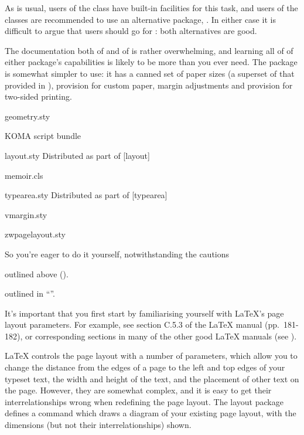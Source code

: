 As is usual, users of the  class have built-in
facilities for this task, and users of the  classes
are recommended to use an alternative package, .  In
either case it is difficult to argue that users should go for
: both alternatives are good.

The documentation both of  and of
 is rather overwhelming, and
learning all of of either package's capabilities is likely to be more
than you ever need.
The  package is somewhat simpler to use: it has a
canned set of paper sizes (a superset of that provided in \LaTeXe{}),
provision for custom paper, margin adjustments and provision for
two-sided printing.
\begin{ctanrefs}
\item[geometry.sty]
\item[\nothtml{\rmfamily}KOMA script bundle]
\item[layout.sty]Distributed as part of [layout]
\item[memoir.cls]
\item[typearea.sty]Distributed as part of [typearea]
\item[vmargin.sty]
\item[zwpagelayout.sty]
\end{ctanrefs}


So you're eager to do it yourself, notwithstanding the cautions
\begin{flatversion}
  outlined above ().
\end{flatversion}
\begin{hyperversion}
  outlined in ``''.
\end{hyperversion}

It's important that you first start by familiarising yourself
with LaTeX's page layout parameters. For example, see section C.5.3 of the
\LaTeX{} manual (pp.~181-182), or corresponding sections in many of the other
good \LaTeX{} manuals (see ). 

\LaTeX{} controls the page layout with a number of parameters, which
allow you to change the distance from the edges of a page to the left
and top edges of your typeset text, the width and height of the text,
and the placement of other text on the page.  However, they are
somewhat complex, and it is easy to get their interrelationships wrong
when redefining the page layout. The layout package defines a
 command which draws a diagram of your existing page
layout, with the dimensions (but not their interrelationships) shown.

